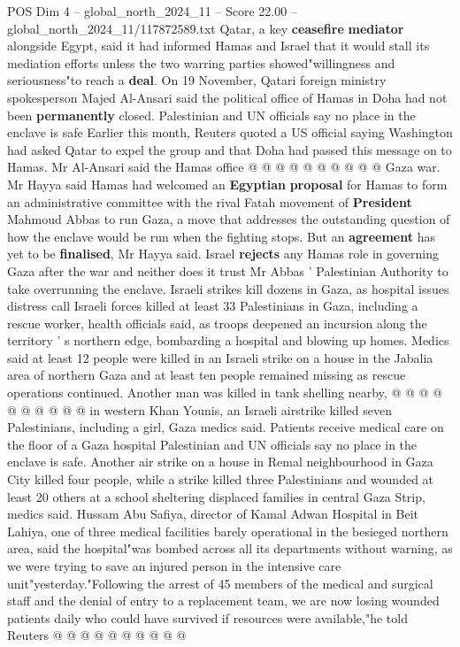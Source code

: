 \begin{textsample}{POS Dim 4 – global\_north\_2024\_11 – Score 22.00 – global\_north\_2024\_11/117872589.txt}
Qatar, a key \textbf{ceasefire} \textbf{mediator} alongside Egypt, said it had informed Hamas and Israel that it would stall its mediation efforts unless the two warring parties showed"willingness and seriousness"to reach a \textbf{deal}.
On 19 November, Qatari foreign ministry spokesperson Majed Al-Ansari said the political office of Hamas in Doha had not been \textbf{permanently} closed.
Palestinian and UN officials say no place in the enclave is safe Earlier this month, Reuters quoted a US official saying Washington had asked Qatar to expel the group and that Doha had passed this message on to Hamas.
Mr Al-Ansari said the Hamas office @ @ @ @ @ @ @ @ @ @ Gaza war.
Mr Hayya said Hamas had welcomed an \textbf{Egyptian} \textbf{proposal} for Hamas to form an administrative committee with the rival Fatah movement of \textbf{President} Mahmoud Abbas to run Gaza, a move that addresses the outstanding question of how the enclave would be run when the fighting stops.
But an \textbf{agreement} has yet to be \textbf{finalised}, Mr Hayya said.
Israel \textbf{rejects} any Hamas role in governing Gaza after the war and neither does it trust Mr Abbas ' Palestinian Authority to take overrunning the enclave.
Israeli strikes kill dozens in Gaza, as hospital issues distress call Israeli forces killed at least 33 Palestinians in Gaza, including a rescue worker, health officials said, as troops deepened an incursion along the territory ' s northern edge, bombarding a hospital and blowing up homes.
Medics said at least 12 people were killed in an Israeli strike on a house in the Jabalia area of northern Gaza and at least ten people remained missing as rescue operations continued.
Another man was killed in tank shelling nearby, @ @ @ @ @ @ @ @ @ @ in western Khan Younis, an Israeli airstrike killed seven Palestinians, including a girl, Gaza medics said.
Patients receive medical care on the floor of a Gaza hospital Palestinian and UN officials say no place in the enclave is safe.
Another air strike on a house in Remal neighbourhood in Gaza City killed four people, while a strike killed three Palestinians and wounded at least 20 others at a school sheltering displaced families in central Gaza Strip, medics said.
Hussam Abu Safiya, director of Kamal Adwan Hospital in Beit Lahiya, one of three medical facilities barely operational in the besieged northern area, said the hospital"was bombed across all its departments without warning, as we were trying to save an injured person in the intensive care unit"yesterday."Following the arrest of 45 members of the medical and surgical staff and the denial of entry to a replacement team, we are now losing wounded patients daily who could have survived if resources were available,"he told Reuters @ @ @ @ @ @ @ @ @ @

\end{textsample}
